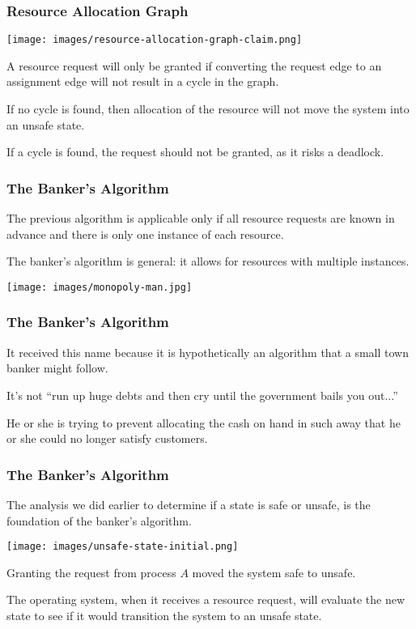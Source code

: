 \begin{frame}
	\frametitle{Resource Allocation Graph}

	\begin{center}
		\texttt{[image: images/resource-allocation-graph-claim.png]}
	\end{center}

	A resource request will only be granted if converting the request edge to an assignment edge will not result in a cycle in the graph.

	If no cycle is found, then allocation of the resource will not move the system into an unsafe state.

	If a cycle is found, the request should not be granted, as it risks a deadlock.

\end{frame}


\begin{frame}
	\frametitle{The Banker's Algorithm}

	The previous algorithm is applicable only if all resource requests are known in advance and there is only one instance of each resource.

	The banker's algorithm is general: it allows for resources with multiple instances.

	\begin{center}
		\texttt{[image: images/monopoly-man.jpg]}
	\end{center}

\end{frame}


\begin{frame}
	\frametitle{The Banker's Algorithm}


	It received this name because it is hypothetically an algorithm that a small town banker might follow.

	It's not ``run up huge debts and then cry until the government bails you out...''

	He or she is trying to prevent allocating the cash on hand in such away that he or she could no longer satisfy customers.

\end{frame}

\begin{frame}
	\frametitle{The Banker's Algorithm}


	The analysis we did earlier to determine if a state is safe or unsafe, is the foundation of the banker's algorithm.

	\begin{center}
		\texttt{[image: images/unsafe-state-initial.png]}
	\end{center}

	Granting the request from process $A$ moved the system safe to unsafe.

	The operating system, when it receives a resource request, will evaluate the new state to see if it would transition the system to an unsafe state.

\end{frame}

